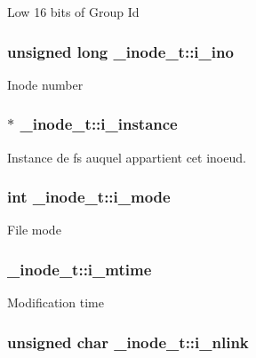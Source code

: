 Low 16 bits of Group Id \hypertarget{struct__inode__t_aba602b843ba63a32ca3950dbaf7e959c}{
\subsubsection[{i\+\_\+ino}]{\setlength{\rightskip}{0pt plus 5cm}unsigned long \+\_\+inode\+\_\+t\+::i\+\_\+ino}}\label{struct__inode__t_aba602b843ba63a32ca3950dbaf7e959c}
Inode number \hypertarget{struct__inode__t_affefc88b22f45e2ec8340d582486d0f2}{
\subsubsection[{i\+\_\+instance}]{$\ast$ \+\_\+inode\+\_\+t\+::i\+\_\+instance}}\label{struct__inode__t_affefc88b22f45e2ec8340d582486d0f2}
Instance de fs auquel appartient cet inoeud. \hypertarget{struct__inode__t_acead4732b6c22ef17ada59203509e728}{
\subsubsection[{i\+\_\+mode}]{\setlength{\rightskip}{0pt plus 5cm}int \+\_\+inode\+\_\+t\+::i\+\_\+mode}}\label{struct__inode__t_acead4732b6c22ef17ada59203509e728}
File mode \hypertarget{struct__inode__t_a331d724391efce2f89aeb1a503ae5c43}{
\subsubsection[{i\+\_\+mtime}]{ \+\_\+inode\+\_\+t\+::i\+\_\+mtime}}\label{struct__inode__t_a331d724391efce2f89aeb1a503ae5c43}
Modification time \hypertarget{struct__inode__t_a929fc1e6837d02a2525027a121b4e67e}{
\subsubsection[{i\+\_\+nlink}]{\setlength{\rightskip}{0pt plus 5cm}unsigned char \+\_\+inode\+\_\+t\+::i\+\_\+nlink}}\label{struct__inode__t_a929fc1e6837d02a2525027a121b4e67e}
